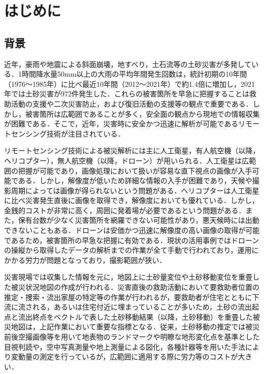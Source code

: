 \chapter{はじめに}
  \section{背景}
    近年，豪雨や地震による斜面崩壊，地すべり，土石流等の土砂災害が多発している．1時間降水量50mm以上の大雨の平均年間発生回数は，統計初期の10年間（1976〜1985年）に比べ最近10年間（2012〜2021年）で約1.4倍に増加し，2021年では土砂災害が972件発生した\cite{背景1, 背景2}．これらの被害箇所を早急に把握することは救助活動の支援や二次災害防止，および復旧活動の支援等の観点で重要である．しかし，被害箇所は広範囲であることが多く，安全面の観点から現地での情報収集が困難である\cite{背景3}．そこで，近年，災害時に安全かつ迅速に解析が可能であるリモートセンシング技術が注目されている\cite{背景4}．

    リモートセンシング技術による被災解析には主に人工衛星，有人航空機（以降，ヘリコプター），無人航空機（以降，ドローン）が用いられる．人工衛星は広範囲の把握が可能であり，画像処理において扱いが容易な直下視点の画像が入手可能である．しかし，解像度が低いため詳細な情報の入手が困難であり，天候や撮影周期によっては画像が得られないという問題がある．ヘリコプターは人工衛星に比べ災害発生直後に画像を取得でき，解像度においても優れている．しかし，金銭的コストが非常に高く，周囲に発着場が必要であるという問題がある．また，保有台数が少なく災害箇所を網羅できない可能性があり，悪天候時には出動できないこともある．ドローンは安価かつ迅速に解像度の高い画像の取得が可能であるため，被害箇所の早急な把握に有効である．現状の活用事例ではドローンの操縦から取得したデータの解析までの作業が全て手動で行われており，運用にかかる労力が問題となっており，撮影範囲が狭い．

    災害現場では収集した情報を元に，地図上に土砂量変位や土砂移動変位を重畳した被災状況地図の作成が行われる．災害直後の救助活動において要救助者位置の推定・捜索・流出家屋の特定等の作業が行われるが，要救助者が住宅とともに下流に流される，あるいは住宅付近に埋まっていることが多いため，土砂の流出起点と流出終点をベクトルで表した土砂移動結果（以降，土砂移動）を重畳した被災地図は，上記作業において重要な指標となる．従来，土砂移動の推定では被災前後空撮画像等を用いて地表物のランドマークや明瞭な地形変化点を基準とした目視判読や，空中写真測量や地上測量による図化，各種計器等を用いた手法により変動量の測定を行っているが\cite{}，広範囲に適用する際に労力等のコストが大きい．


